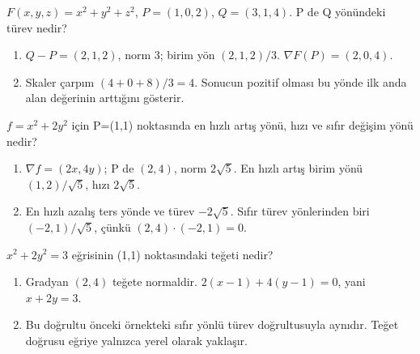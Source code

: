 \begin{tcolorbox}[title={Örnek 6.10 | P den Q ya doğru değişim},colframe=accent]\(F(x,y,z)=x^2+y^2+z^2\), \(P=(1,0,2)\), \(Q=(3,1,4)\). P de Q yönündeki türev nedir?
\par\vspace{1mm}{\scriptsize\sffamily Pekiştirme}\end{tcolorbox}
\begin{tcolorbox}[title={Adım adım çözüm},colback=green!3!white,colframe=green]\begin{enumerate}
\item \(Q-P=(2,1,2)\), norm 3; birim yön \((2,1,2)/3\). \(\nabla F(P)=(2,0,4)\).
\item Skaler çarpım \((4+0+8)/3=4\). Sonucun pozitif olması bu yönde ilk anda alan değerinin arttığını gösterir.
\end{enumerate}\end{tcolorbox}
\begin{tcolorbox}[title={Örnek 6.11 | Gradyanla yön seçmek},colframe=accent]\(f=x^2+2y^2\) için P=(1,1) noktasında en hızlı artış yönü, hızı ve sıfır değişim yönü nedir?
\par\vspace{1mm}{\scriptsize\sffamily Pekiştirme}\end{tcolorbox}
\begin{tcolorbox}[title={Adım adım çözüm},colback=green!3!white,colframe=green]\begin{enumerate}
\item \(\nabla f=(2x,4y)\); P de \((2,4)\), norm \(2\sqrt5\). En hızlı artış birim yönü \((1,2)/\sqrt5\), hızı \(2\sqrt5\).
\item En hızlı azalış ters yönde ve türev \(-2\sqrt5\). Sıfır türev yönlerinden biri \((-2,1)/\sqrt5\), çünkü \((2,4)\cdot(-2,1)=0\).
\end{enumerate}\end{tcolorbox}
\begin{tcolorbox}[title={Örnek 6.12 | Seviye eğrisinin teğet doğrusu},colframe=accent]\(x^2+2y^2=3\) eğrisinin (1,1) noktasındaki teğeti nedir?
\par\vspace{1mm}{\scriptsize\sffamily Pekiştirme}\end{tcolorbox}
\begin{tcolorbox}[title={Adım adım çözüm},colback=green!3!white,colframe=green]\begin{enumerate}
\item Gradyan \((2,4)\) teğete normaldir. \(2(x-1)+4(y-1)=0\), yani \(x+2y=3\).
\item Bu doğrultu önceki örnekteki sıfır yönlü türev doğrultusuyla aynıdır. Teğet doğrusu eğriye yalnızca yerel olarak yaklaşır.
\end{enumerate}\end{tcolorbox}
